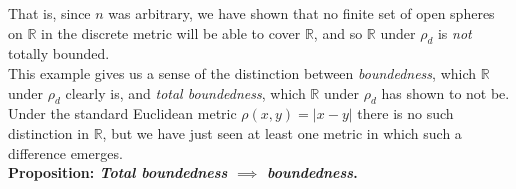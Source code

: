 \documentclass[12pt]{article}
\newlength\tindent
\renewcommand{\indent}{\hspace*{\tindent}}
\newcommand{\R}{\mathbb R}
\begin{document}
\indent That is, since $n$ was arbitrary, we have shown that no finite set of open spheres on $\R$ in the discrete metric will be able to cover $\R$, and so $\R$ under $\rho_d$ is {\em not} totally bounded. \\

\indent This example gives us a sense of the distinction between {\em boundedness}, which $\R$ under $\rho_d$ clearly is, and {\em total boundedness}, which $\R$ under $\rho_d$ has shown to not be. Under the standard Euclidean metric $\rho(x,y) = |x - y|$ there is no such distinction in $\R$, but we have just seen at least one metric in which such a difference emerges. \\

%
%
{\bf Proposition: {\em Total boundedness $\implies$ boundedness}.} 
\end{document}
